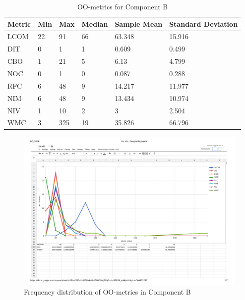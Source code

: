 \begin{table}[]
\centering
\caption{OO-metrics for Component B}
\label{tab:oometrics-blc}
\begin{tabular}{|l|l|l|l|l|l|}
\hline
\textbf{Metric} & \textbf{Min} & \textbf{Max} & \textbf{Median} & \textbf{Sample Mean} & \textbf{Standard Deviation} \\ \hline
LCOM            & 22           & 91          & 66              & 63.348               & 15.916                    \\ \hline
DIT             & 0           & 1           & 1             & 0.609              & 0.499                       \\ \hline
CBO             & 1          & 21           & 5              & 6.13                & 4.799                       \\ \hline
NOC             & 0            & 1           & 0               & 0.087                & 0.288                       \\ \hline
RFC             & 6            & 48          & 9              & 14.217              & 11.977                      \\ \hline
NIM             & 6           & 48           & 9               & 13.434                & 10.974                       \\ \hline
NIV             & 1            & 10           & 2               & 3                & 2.504                       \\ \hline
WMC            & 3            & 325          & 19              & 35.826               & 66.796                      \\ \hline
\end{tabular}
\end{table}


\begin{landscape}
\setlength\LTleft{-.5in}
	\begin{figure}
	\centering
	\includegraphics[width=\textwidth]{images/pdf/blc.pdf}
	\caption{Frequency distribution of OO-metrics in Component B}
	\label{fig:blcgraph}
	\end{figure}
\end{landscape}



